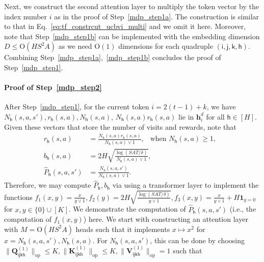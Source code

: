 \documentclass[10pt]{article}
\newcommand{\lops}[1]{\|{#1}\|_{\mathrm{op}}}
\newcommand{\<}{\left\langle}
\renewcommand{\>}{\right\rangle}
\renewcommand{\bQ}{\mathbf{Q}}
\newcommand{\bone}{{\mathbf 1}}
\newcommand{\partd}{{d}}
\newcommand{\state}{{s}}
\newcommand{\action}{{a}}
\newcommand{\reward}{{r}}
\newcommand{\totlen}{{T}}
\newcommand{\Numepi}{{K}}
\newcommand{\horizon}{{H}}
\renewcommand{\horizon}{{H}}
\newcommand{\bonus}{{b}}
\newcommand{\estbonus}{{b}}
\newcommand{\esttransit}{\widehat{P}}
\newcommand{\tresttransit}{\widehat{P}}
\newcommand{\head}{{M}}
\newcommand{\Numst}{{S}}
\newcommand{\Numact}{{A}}
\newcommand{\Numvi}{{N}}
\newcommand{\conO}{{\mathrm{O}}}
\def\bK{{\mathbf K}}
\def\bQ{{\mathbf Q}}
\def\bV{{\mathbf V}}
\def\bh{{\mathbf h}}
\def\si{{\mathsf{i}}}
\def\sj{{\mathsf{j}}}
\def\sk{{\mathsf{k}}}
\def\sh{{\mathsf{h}}}
\begin{document}
Next, we construct the second attention layer to multiply the token vector by the index number $i$ as in the proof of Step~\ref{mdp_step1a}. The construction is similar to that in Eq.~\eqref{eq:tf_constrcut_ucbvi_multi} and we omit it here. Moreover, note that Step~\ref{mdp_step1b} can be implemented with the embedding dimension $D\leq\conO(\horizon\Numst^2\Numact)$ as we need $\conO(1)$ dimensions for each quadruple $(\si,\sj,\sk,\sh)$.  Combining Step~\ref{mdp_step1a},~\ref{mdp_step1b} concludes the proof of Step~\ref{mdp_step1}.
\paragraph{Proof of Step~\ref{mdp_step2}}
After Step~\ref{mdp_step1}, for the current token $i=2(t-1)+k$, we have $\Numvi_\sh(\state,\action,\state'),\reward_\sh(\state,\action),\Numvi_\sh(\state,\action)$, $\Numvi_\sh(\state,\action)\reward_\sh(\state,\action)$  lie in $\bh_i^\partd$ for all $\sh\in[\horizon]$. Given these vectors that store the number of visits and rewards, note that
\begin{align*}
\reward_\sh(\state,\action)&=\frac{\Numvi_\sh(\state,\action)\reward_\sh(\state,\action)}{\Numvi_\sh(\state,\action)\vee1},~~\text{ when  } \Numvi_\sh(\state,\action)\geq1,~~~\\
\bonus_\sh(\state,\action)
&=2\horizon\sqrt{\frac{\log(\Numst\Numact\totlen/\delta)}{\Numvi_\sh(\state,\action)\vee1}},
\\
\tresttransit_\sh(\state,\action,\state')
&=\frac{\Numvi_\sh(\state,\action,\state')}{\Numvi_\sh(\state,\action)\vee 1}.
\end{align*}
Therefore, we may compute $\esttransit_\sh,\estbonus_\sh$ via using a transformer layer  to implement the functions $f_1(x,y)=\frac{x}{y\vee1},f_2(y)=2\horizon\sqrt{\frac{\log(\Numst\Numact\totlen/\delta)}{y\vee 1}},f_3(x,y)=\frac{x}{y\vee1}+\horizon\bone_{y=0}$ for $x,y\in\{0\}\cup[\Numepi]$.
We demonstrate the computation of $\esttransit_\sh(\state,\action,\state')$  (i.e., the computation of $f_1(x,y)$) here. We start with constructing an attention layer with $\head=\conO(\horizon\Numst^2\Numact)$ heads such that it implements  $x\mapsto x^2$ for $x=\Numvi_\sh(\state,\action,\state'),\Numvi_\sh(\state,\action)$. For $\Numvi_\sh(\state,\action,\state')$, this can be done by  choosing  $\lops{\bQ_{\si\sj\sk\sh}^{(1)}}\leq\Numepi,\lops{\bK_{\si\sj\sk\sh}^{(1)}}\leq\Numepi,\lops{\bV_{\si\sj\sk\sh}^{(1)}}=1$ such that
\end{document}
